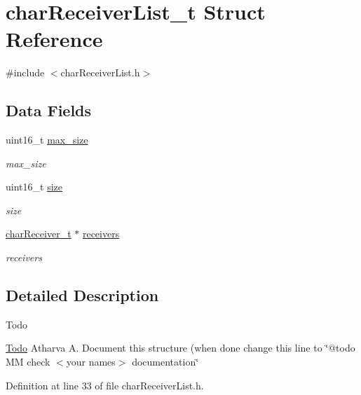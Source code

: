 \hypertarget{structchar_receiver_list__t}{}\section{char\+Receiver\+List\+\_\+t Struct Reference}
\label{structchar_receiver_list__t}


{\ttfamily \#include $<$char\+Receiver\+List.\+h$>$}

\subsection*{Data Fields}
\begin{DoxyCompactItemize}
\item 
uint16\+\_\+t \hyperlink{structchar_receiver_list__t_a58516967d6d94fcbcd0b8fc2320e581f}{max\+\_\+size}
\begin{DoxyCompactList}\small\item\em max\+\_\+size \end{DoxyCompactList}\item 
uint16\+\_\+t \hyperlink{structchar_receiver_list__t_aaba88b24a21a6c70c895c0d55f4a69a0}{size}
\begin{DoxyCompactList}\small\item\em size \end{DoxyCompactList}\item 
\hyperlink{group__receiverlist_ga69666a2f4dbb47a4ffd7b07c252777cf}{char\+Receiver\+\_\+t} $\ast$ \hyperlink{structchar_receiver_list__t_a11b30fbbfca635c2ca5a60a7ef8e7a58}{receivers}
\begin{DoxyCompactList}\small\item\em receivers \end{DoxyCompactList}\end{DoxyCompactItemize}


\subsection{Detailed Description}
\begin{DoxyRefDesc}{Todo}
\item[\hyperlink{todo__todo000002}{Todo}]Atharva A. Document this structure (when done change this line to \char`\"{}@todo M\+M check $<$your names$>$ documentation\char`\"{} \end{DoxyRefDesc}


Definition at line 33 of file char\+Receiver\+List.\+h.



